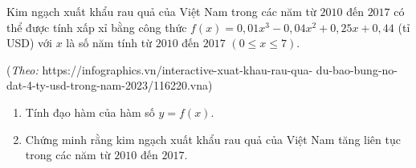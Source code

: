 \begin{bt}%
	Kim ngạch xuất khẩu rau quả của Việt Nam trong các năm từ $2010$ đến $2017$ có thể được tính xấp xỉ bằng công thức $f(x)=0{,}01x^3-0{,}04x^2+0{,}25x+0{,}44$ (tỉ USD) với $x$ là số năm tính từ $2010$ đến $2017$ $(0\leq x\leq 7)$.
	\begin{flushright}
		(\textit{Theo:} https://infographics.vn/interactive-xuat-khau-rau-qua-
		du-bao-bung-no-dat-4-ty-usd-trong-nam-2023/116220.vna)
	\end{flushright}
	\begin{enumerate}
		\item Tính đạo hàm của hàm số $y=f(x)$.
		\item Chứng minh rằng kim ngạch xuất khẩu rau quả của Việt Nam tăng liên tục trong các năm từ $2010$ đến $2017$.
	\end{enumerate}
\end{bt}

